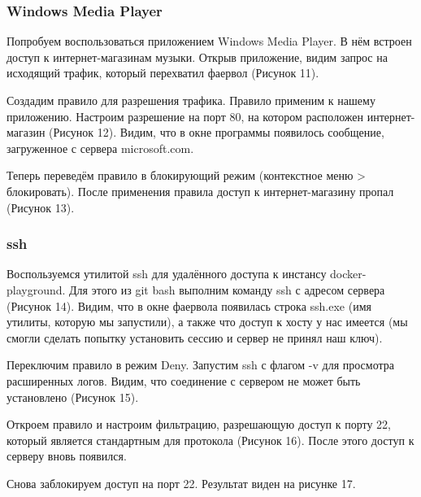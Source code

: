 \subsubsection{Windows Media Player}

Попробуем воспользоваться приложением Windows Media Player. В нём встроен доступ к интернет-магазинам музыки. Открыв приложение, видим запрос на исходящий трафик, который перехватил фаервол (Рисунок 11). 


Создадим правило для разрешения трафика. Правило применим к нашему приложению. Настроим разрешение на порт 80, на котором расположен интернет-магазин (Рисунок 12). Видим, что в окне программы появилось сообщение, загруженное с сервера microsoft.com. 


Теперь переведём правило в блокирующий режим (контекстное меню > блокировать). После применения правила доступ к интернет-магазину пропал (Рисунок 13).

\FloatBarrier
\clearpage


\subsubsection{ssh}

Воспользуемся утилитой ssh для удалённого доступа к инстансу docker-\linebreak playground. Для этого из git bash выполним команду ssh с адресом сервера (Рисунок 14).
Видим, что в окне фаервола появилась строка ssh.exe (имя утилиты, которую мы запустили), а также что доступ к хосту у нас имеется (мы смогли сделать попытку установить сессию и сервер не принял наш ключ).


Переключим правило в режим Deny. Запустим ssh с флагом -v для просмотра расширенных логов. Видим, что соединение с сервером не может быть установлено (Рисунок 15).


Откроем правило и настроим фильтрацию, разрешающую доступ к порту 22, который является стандартным для протокола (Рисунок 16). После этого доступ к серверу вновь появился.


Снова заблокируем доступ на порт 22. Результат виден на рисунке 17.

